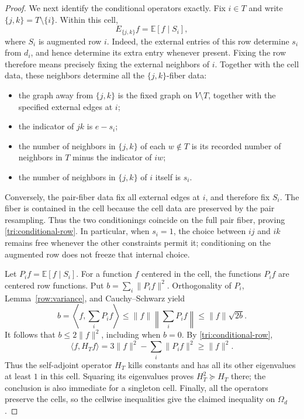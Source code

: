 \begin{proof}
We next identify the conditional operators exactly.  Fix $i\in T$
and write $\{j,k\}=T\setminus\{i\}$.  Within this cell,
\begin{equation}\label{tri:conditional-row}
 E_{\{j,k\}}f=\mathbb E[f\mid S_i],
\end{equation}
where $S_i$ is augmented row $i$.
Indeed, the external entries of this row determine $s_i$ from $d_i$,
and hence determine its extra entry whenever present.  Fixing the
row therefore means precisely fixing the external neighbors of $i$.
Together with the cell data, these neighbors determine all the
$\{j,k\}$-fiber data:
\begin{itemize}
\item the graph away from $\{j,k\}$ is the fixed graph on
$V\setminus T$, together with the specified external edges at $i$;
\item the indicator of $jk$ is $e-s_i$;
\item the number of neighbors in $\{j,k\}$ of each $w\notin T$ is
its recorded number of neighbors in $T$ minus the indicator of $iw$;
\item the number of neighbors in $\{j,k\}$ of $i$ itself is $s_i$.
\end{itemize}
Conversely, the pair-fiber data fix all external edges at $i$, and
therefore fix $S_i$.  The fiber is contained in the cell because the
cell data are preserved by the pair resampling.  Thus the two
conditionings coincide on the full pair fiber, proving
\eqref{tri:conditional-row}.  In particular, when $s_i=1$, the choice
between $ij$ and $ik$ remains free whenever the other constraints
permit it; conditioning on the augmented row does not freeze that
internal choice.

Let $P_i f=\mathbb E[f\mid S_i]$.  For a function $f$ centered in the
cell, the functions $P_i f$ are centered row functions.  Put
$b=\sum_i\|P_i f\|^2$.  Orthogonality of $P_i$,
Lemma~\ref{row:variance}, and Cauchy--Schwarz yield
\[
 b=\left\langle f,\sum_i P_i f\right\rangle
 \le\|f\|\left\|\sum_i P_i f\right\|
 \le\|f\|\sqrt{2b}.
\]
It follows that $b\le2\|f\|^2$, including when $b=0$.
By \eqref{tri:conditional-row},
\[
 \langle f,H_Tf\rangle
 =3\|f\|^2-\sum_i\|P_i f\|^2\ge\|f\|^2.
\]
Thus the self-adjoint operator $H_T$ kills constants and has all its
other eigenvalues at least $1$ in this cell.  Squaring its eigenvalues
proves $H_T^2\succeq H_T$ there; the conclusion is also immediate for
a singleton cell.  Finally, all the operators preserve the cells, so
the cellwise inequalities give the claimed inequality on $\Omega_d$.
\end{proof}
